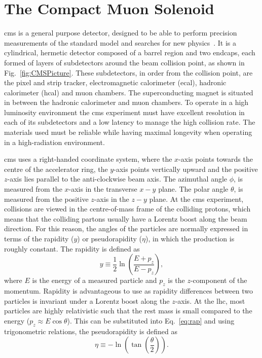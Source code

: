 \section{The Compact Muon Solenoid}
\label{sec:CMS}

\acrshort{cms} is a general purpose detector, designed to be able to perform precision measurements of the standard model and searches for new physics~\cite{CMSExperiment}. 
It is a cylindrical, hermetic detector composed of a barrel region and two endcaps, each formed of layers of subdetectors around the beam collision point, as shown in Fig.~\ref{fig:CMSPicture}. 
These subdetectors, in order from the collision point, are the pixel and strip tracker, electromagnetic calorimeter (\acrshort{ecal}), hadronic calorimeter (\acrshort{hcal}) and muon chambers.
The superconducting magnet is situated in between the hadronic calorimeter and muon chambers.
To operate in a high luminosity environment the \acrshort{cms} experiment must have excellent resolution in each of its subdetectors and a low latency to manage the high collision rate. 
The materials used must be reliable while having maximal longevity when operating in a high-radiation environment.

\acrshort{cms} uses a right-handed coordinate system, where the $x$-axis points towards the centre of the accelerator ring, the $y$-axis points vertically upward and the positive $z$-axis lies parallel to the anti-clockwise beam axis. 
The azimuthal angle $\phi$, is measured from the $x$-axis in the transverse $x-y$ plane. 
The polar angle $\theta$, is measured from the positive $z$-axis in the $z-y$ plane.
At the \acrshort{cms} experiment, collisions are viewed in the centre-of-mass frame of the colliding protons, which means that the colliding partons usually have a Lorentz boost along the beam direction.
For this reason, the angles of the particles are normally expressed in terms of the rapidity ($y$) or pseudorapidity ($\eta$), in which the production is roughly constant.  
The rapidity is defined as
\begin{equation}
\label{eq:rap}
y\equiv {\frac{1}{2}}\ln\left({\frac{E+p_{z}}{E-p_{z}}}\right),
\end{equation}
where $E$ is the energy of a measured particle and $p_{z}$ is the $z$-component of the momentum.
Rapidity is advantageous to use as rapidity differences between two particles is invariant under a Lorentz boost along the $z$-axis.
At the \acrshort{lhc}, most particles are highly relativistic such that the rest mass is small compared to the energy ($p_{z}\approx E\cos\theta$). This can be substituted into Eq.~\ref{eq:rap} and using trigonometric relations, the pseudorapidity is defined as
\begin{equation}
\label{eq:eta}
\eta \equiv -\ln\left(\tan\left({\frac{\theta}{2}}\right)\right).
\end{equation}

